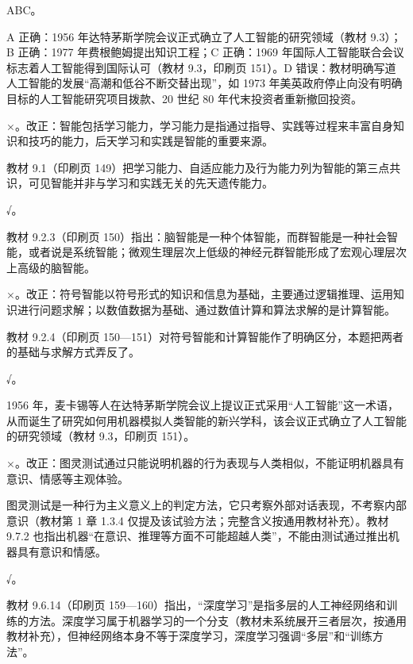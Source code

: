\documentclass[a4paper,11pt]{article}
\begin{document}
\q ABC。\begin{analysis}A 正确：1956 年达特茅斯学院会议正式确立了人工智能的研究领域（教材 9.3）；B 正确：1977 年费根鲍姆提出知识工程；C 正确：1969 年国际人工智能联合会议标志着人工智能得到国际认可（教材 9.3，印刷页 151）。D 错误：教材明确写道人工智能的发展“高潮和低谷不断交替出现”，如 1973 年美英政府停止向没有明确目标的人工智能研究项目拨款、20 世纪 80 年代末投资者重新撤回投资。\end{analysis}


\q ×。改正：智能包括学习能力，学习能力是指通过指导、实践等过程来丰富自身知识和技巧的能力，后天学习和实践是智能的重要来源。\begin{analysis}教材 9.1（印刷页 149）把学习能力、自适应能力及行为能力列为智能的第三点共识，可见智能并非与学习和实践无关的先天遗传能力。\end{analysis}

\q √。\begin{analysis}教材 9.2.3（印刷页 150）指出：脑智能是一种个体智能，而群智能是一种社会智能，或者说是系统智能；微观生理层次上低级的神经元群智能形成了宏观心理层次上高级的脑智能。\end{analysis}

\q ×。改正：符号智能以符号形式的知识和信息为基础，主要通过逻辑推理、运用知识进行问题求解；以数值数据为基础、通过数值计算和算法求解的是计算智能。\begin{analysis}教材 9.2.4（印刷页 150—151）对符号智能和计算智能作了明确区分，本题把两者的基础与求解方式弄反了。\end{analysis}

\q √。\begin{analysis}1956 年，麦卡锡等人在达特茅斯学院会议上提议正式采用“人工智能”这一术语，从而诞生了研究如何用机器模拟人类智能的新兴学科，该会议正式确立了人工智能的研究领域（教材 9.3，印刷页 151）。\end{analysis}

\q ×。改正：图灵测试通过只能说明机器的行为表现与人类相似，不能证明机器具有意识、情感等主观体验。\begin{analysis}图灵测试是一种行为主义意义上的判定方法，它只考察外部对话表现，不考察内部意识（教材第 1 章 1.3.4 仅提及该试验方法；完整含义按通用教材补充）。教材 9.7.2 也指出机器“在意识、推理等方面不可能超越人类”，不能由测试通过推出机器具有意识和情感。\end{analysis}

\q √。\begin{analysis}教材 9.6.14（印刷页 159—160）指出，“深度学习”是指多层的人工神经网络和训练的方法。深度学习属于机器学习的一个分支（教材未系统展开三者层次，按通用教材补充），但神经网络本身不等于深度学习，深度学习强调“多层”和“训练方法”。\end{analysis}
\end{document}
